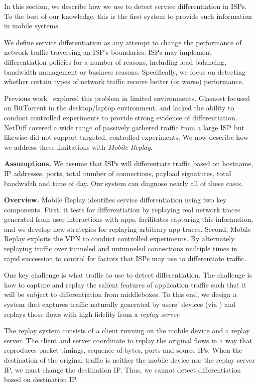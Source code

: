 In this section, we describe how we use \meddle to detect service differentiation 
in ISPs. To the best of our knowledge, this is the first system to provide such information 
in mobile systems.

We define service differentiation as any attempt to change the performance 
of network traffic traversing an ISP's boundaries. ISPs may implement differentiation policies 
for a number of reasons, including load balancing, bandwidth management or business reasons. 
Specifically, we focus on detecting whether certain types of network traffic receive 
better (or worse) performance. 

Previous work~\cite{dischinger:glasnost,tariq:nano,zhang:netdiff} explored this problem in limited 
environments. Glasnost focused on BitTorrent in the desktop/laptop environment, 
and lacked the ability to conduct controlled experiments to provide strong evidence 
of differentiation. NetDiff covered a wide range of passively gathered traffic from a 
large ISP but likewise did not support targeted, controlled experiments. We now 
describe how we address these limitations with \emph{Mobile Replay}. 

\noindent\textbf{Assumptions.} We assume that ISPs will differentiate traffic based on hostname, 
IP addresses, ports, total number of connections, payload signatures, total bandwidth and time of day. 
Our system can diagnose nearly all of these cases. 

\noindent\textbf{Overview.} Mobile Replay identifies service differentiation using 
two key components. First, it tests for differentiation by replaying real network traces 
generated from user interactions with apps. \meddle facilitates capturing this information, 
and we develop new strategies for replaying arbitrary app traces. Second, Mobile 
Replay exploits the \meddle VPN to conduct controlled experiments. By alternately replaying 
traffic over tunneled and untunneled connections multiple times in rapid succession to control 
for factors that ISPs may use to differentiate traffic.

One key challenge is what traffic to use to detect differentiation. The challenge is how to capture and replay 
the salient features of application traffic such that it will be subject to differentiation 
from middleboxes. To this end, we design a system that captures 
traffic naturally generated by users' devices (via \meddle) and replays those flows 
with high fidelity from a \emph{replay server}. 

The replay system consists of a client running on the mobile device and a replay server. 
The client and server coordinate to replay the original flows in a way that reproduces packet timings, 
sequence of bytes, ports and source IPs. When the destination of the original traffic is neither the 
mobile device nor the replay server IP, we must change the destination IP. Thus, we cannot detect 
differentiation based on destination IP. 

